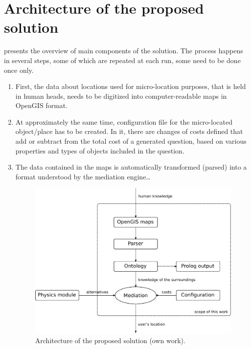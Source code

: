 \section{Architecture of the proposed solution}
\label{sec:architecture}

 presents the overview of main components of the solution. The process happens in several steps, some of which are repeated at each run, some need to be done once only.

\begin{enumerate}
	\item First, the data about locations used for micro-location purposes, that is held in human heads, needs to be digitized into computer-readable maps in OpenGIS format.
	\item At approximately the same time, configuration file for the micro-located object/place has to be created. In it, there are changes of costs defined that add or subtract from the total cost of a generated question, based on various properties and types of objects included in the question.
	\item The data contained in the maps is automatically transformed (parsed) into a format understood by the mediation engine\ldots

	\begin{figure}
		\centering
		\includegraphics[width=\textwidth]{architecture}
		\caption{Architecture of the proposed solution (own work).}
		\label{fig:architecture}
	\end{figure}


\end{enumerate}
